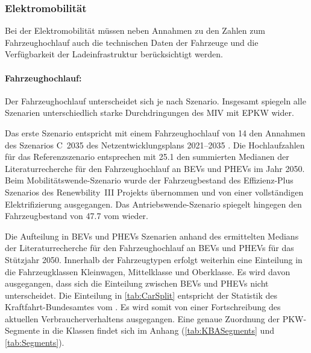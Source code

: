 \subsubsection{Elektromobilität}\label{chap:EMob_Szenarien}

Bei der Elektromobilität müssen neben Annahmen zu den Zahlen zum Fahrzeughochlauf auch die technischen Daten der Fahrzeuge und die Verfügbarkeit der Ladeinfrastruktur berücksichtigt werden.

\paragraph{Fahrzeughochlauf:}
Der Fahrzeughochlauf unterscheidet sich je nach Szenario.
Insgesamt spiegeln alle Szenarien unterschiedlich starke Durchdringungen des \gls{MIV} mit \gls{EPKW} wider.\medskip

Das erste Szenario entspricht mit einem Fahrzeughochlauf von \SI{14}{\MioStk} den Annahmen des Szenarios C~\num{2035} des Netzentwicklungsplans \numrange[range-phrase=~{--}~]{2021}{2035} \cite{BNetzA2020}.
Die Hochlaufzahlen für das Referenzszenario entsprechen mit \SI{25.1}{\MioStk} den summierten Medianen der Literaturrecherche für den Fahrzeughochlauf an \glspl{BEV} und \glspl{PHEV} im Jahr \num{2050}.
Beim Mobilitätswende-Szenario wurde der Fahrzeugbestand des Effizienz-Plus Szenarios des Renewbility~III Projekts \cite{Institut2016} übernommen und von einer vollständigen Elektrifizierung ausgegangen.
Das Antriebswende-Szenario spiegelt hingegen den Fahrzeugbestand von \SI{47.7}{\MioStk} vom  \cite{KBA2020} wieder.



Die Aufteilung in \glspl{BEV} und \glspl{PHEV} Szenarien anhand des ermittelten Medians der Literaturrecherche für den Fahrzeughochlauf an \glspl{BEV} und \glspl{PHEV} für das Stützjahr \num{2050}.
Innerhalb der Fahrzeugtypen erfolgt weiterhin eine Einteilung in die Fahrzeugklassen Kleinwagen, Mittelklasse und Oberklasse.
Es wird davon ausgegangen, dass sich die Einteilung zwischen \glspl{BEV} und \glspl{PHEV} nicht unterscheidet.
Die Einteilung in \autoref{tab:CarSplit} entspricht der Statistik des Kraftfahrt-Bundesamtes \cite{KBASegments2020} vom .
Es wird somit von einer Fortschreibung des aktuellen Verbraucherverhaltens ausgegangen.
Eine genaue Zuordnung der \gls{PKW}-Segmente in die Klassen findet sich im Anhang (\autoref{tab:KBASegments} und \autoref{tab:Segments}).

